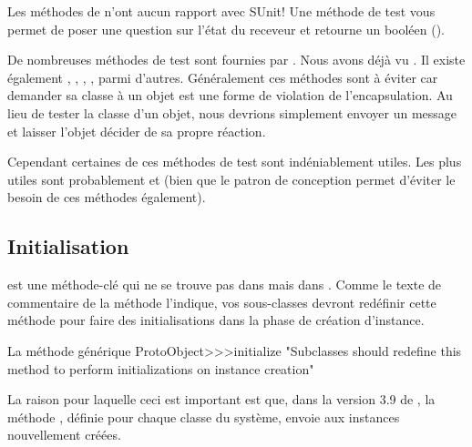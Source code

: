 \documentclass[a4paper,10pt,twoside]{book}
\begin{document}
Les m\'ethodes de  n'ont aucun rapport avec SUnit! Une m\'ethode de test vous permet de poser une question sur l'\'etat du receveur et retourne un bool\'een ().

De nombreuses m\'ethodes de test sont fournies par . Nous
avons d\'ej\`a vu . Il existe \'egalement
, ,
, , parmi
d'autres. G\'en\'eralement ces m\'ethodes sont \`a \'eviter car
demander sa classe \`a un objet est une forme de violation de
l'encapsulation. Au lieu de tester la classe d'un objet, nous devrions
simplement envoyer un message et laisser l'objet d\'ecider de sa propre r\'eaction.

Cependant certaines de ces m\'ethodes de test sont ind\'eniablement utiles. Les plus utiles sont probablement  et  (bien que le patron de conception \cite{Wool98a} permet d'\'eviter le besoin de ces m\'ethodes \'egalement).


\subsection{Initialisation}
 est une m\'ethode-cl\'e qui ne se
trouve pas dans  mais dans .
Comme le texte de commentaire de la m\'ethode l'indique, vos sous-classes
devront red\'efinir cette m\'ethode pour faire des initialisations
dans la phase de cr\'eation d'instance.

\begin{method}{La m\'ethode g\'en\'erique }
ProtoObject>>>initialize
    "Subclasses should redefine this method to perform initializations on instance creation"
\end{method}

La raison pour laquelle ceci est important est que, dans la version 3.9 de \sq, la m\'ethode , d\'efinie pour chaque classe du syst\`eme, envoie  aux instances nouvellement cr\'e\'ees.
\end{document}
